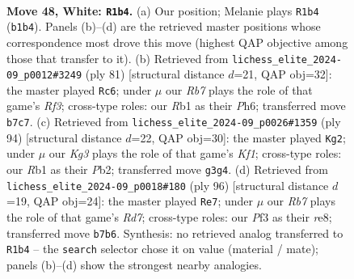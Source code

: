 \documentclass[11pt]{article}
\begin{document}
\clearpage

\begin{figure}[p]\centering
\begin{subfigure}{0.46\textwidth}\centering
\resizebox{\linewidth}{!}{%
\newchessgame
\chessboard[
  setfen={8/1R3p2/p3pk2/8/P3P3/5PKP/r7/1R6 w - - 2 48},
  showmover=false,
  pgfstyle=straightmove, color=movearrow, markmove={b1-b4}
]}
\caption{}
\end{subfigure}\hfill
\begin{subfigure}{0.46\textwidth}\centering
\resizebox{\linewidth}{!}{%
\newchessgame
\chessboard[
  setfen={8/4pk2/5r1p/2p1p3/7P/2R3P1/5PK1/8 b - - 1 41},
  showmover=false,
  pgfstyle=straightmove, color=movearrow, markmove={f6-c6}
]}
\caption{}
\end{subfigure}
\\[4pt]
\begin{subfigure}{0.46\textwidth}\centering
\resizebox{\linewidth}{!}{%
\newchessgame
\chessboard[
  setfen={8/8/1pp3k1/5p2/3P2pP/4r1P1/1P3R2/5K2 w - - 2 48},
  showmover=false,
  pgfstyle=straightmove, color=movearrow, markmove={f1-g2}
]}
\caption{}
\end{subfigure}\hfill
\begin{subfigure}{0.46\textwidth}\centering
\resizebox{\linewidth}{!}{%
\newchessgame
\chessboard[
  setfen={4r3/R2R2p1/1P5k/2P4p/8/6PK/1r6/8 w - - 3 49},
  showmover=false,
  pgfstyle=straightmove, color=movearrow, markmove={d7-e7}
]}
\caption{}
\end{subfigure}
\caption{\textbf{Move 48, White: \texttt{R1b4}.} (a) Our position; Melanie plays \texttt{R1b4} (\texttt{b1b4}). Panels (b)--(d) are the retrieved master positions whose correspondence most drove this move (highest QAP objective among those that transfer to it). (b) Retrieved from \texttt{lichess\_elite\_2024-09\_p0012\#3249} (ply 81) [structural distance $d$=21, QAP obj=32]: the master played \texttt{Rc6}; under $\mu$ our \emph{Rb7} plays the role of that game's \emph{Rf3}; cross-type roles: our \emph{R}b1 as their \emph{P}h6; transferred move \texttt{b7c7}. (c) Retrieved from \texttt{lichess\_elite\_2024-09\_p0026\#1359} (ply 94) [structural distance $d$=22, QAP obj=30]: the master played \texttt{Kg2}; under $\mu$ our \emph{Kg3} plays the role of that game's \emph{Kf1}; cross-type roles: our \emph{R}b1 as their \emph{P}b2; transferred move \texttt{g3g4}. (d) Retrieved from \texttt{lichess\_elite\_2024-09\_p0018\#180} (ply 96) [structural distance $d$=19, QAP obj=24]: the master played \texttt{Re7}; under $\mu$ our \emph{Rb7} plays the role of that game's \emph{Rd7}; cross-type roles: our \emph{P}f3 as their \emph{r}e8; transferred move \texttt{b7b6}. Synthesis: no retrieved analog transferred to \texttt{R1b4} -- the \texttt{search} selector chose it on value (material / mate); panels (b)--(d) show the strongest nearby analogies.}
\label{fig:thought-m94}
\end{figure}
\end{document}

